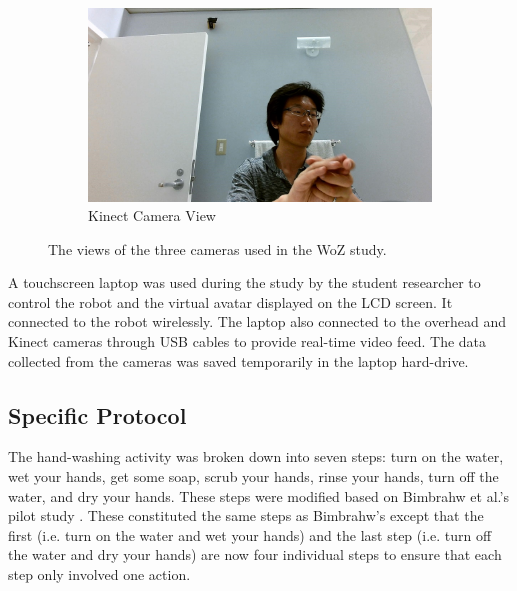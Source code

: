 \documentclass{ut-thesis}
\begin{document}
\begin{figure}[H]
	
	\begin{subfigure}[b]{0.49\textwidth}
		\includegraphics[width=1.1\linewidth]{./img/kinect_view}
		\caption{Kinect Camera View}
	\end{subfigure}%

	\caption{The views of the three cameras used in the WoZ study.}
	\label{fig:CameraViews}
\end{figure}


A touchscreen laptop was used during the study by the student researcher to control the robot and the virtual avatar displayed on the LCD screen. It connected to the robot wirelessly. The laptop also connected to the overhead and Kinect cameras through USB cables to provide real-time video feed. The data collected from the cameras was saved temporarily in the laptop hard-drive.

\subsection{Specific Protocol}
\label{sec:SpecificProtocol}
The hand-washing activity was broken down into seven steps: turn on the water, wet your hands, get some soap, scrub your hands, rinse your hands, turn off the water, and dry your hands.  These steps were modified based on Bimbrahw et al.'s pilot study \cite{bimbrahw2012investigating}. These constituted the same steps as Bimbrahw's except that the first (i.e. turn on the water and wet your hands) and the last step (i.e. turn off the water and dry your hands) are now four individual steps to ensure that each step only involved one action.
\end{document}
